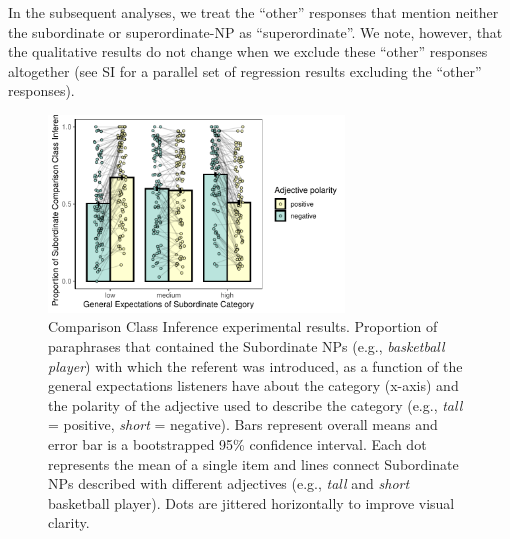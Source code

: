 \documentclass[doc, floatsintext]{apa6}
\begin{document}
In the subsequent analyses, we treat the ``other'' responses that mention neither the subordinate or superordinate-NP as ``superordinate''.
We note, however, that the qualitative results do not change when we exclude these ``other'' responses altogether (see SI for a parallel set of regression results excluding the ``other'' responses). 





\begin{figure}[t]
\centering
\includegraphics[width=0.7\textwidth]{figs/bars_cc_finalExpt_prereg_bars_syncDodge.pdf}
\caption{Comparison Class Inference experimental results. Proportion of paraphrases that contained the Subordinate NPs (e.g., \emph{basketball player}) with which the referent was introduced, as a function of the general expectations listeners have about the category (x-axis) and the polarity of the adjective used to describe the category (e.g., \emph{tall} = positive, \emph{short} = negative). Bars represent overall means and error bar is a bootstrapped 95\% confidence interval. Each dot represents the mean of a single item and lines connect Subordinate NPs described with different adjectives (e.g., \emph{tall} and \emph{short} basketball player). Dots are jittered horizontally to improve visual clarity.}\label{fig:ccInferenceMain}
\end{figure}
\end{document}
